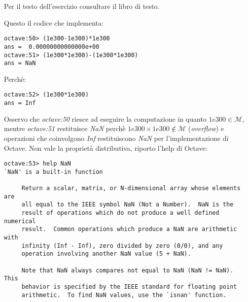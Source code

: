 \begin{exercise}[1.14]
Per il testo dell'esercizio consultare il libro di testo.
\end{exercise}
Questo il codice che implementa:
\begin{lstlisting}
octave:50> (1e300-1e300)*1e300
ans =  0.00000000000000e+00
octave:51> (1e300*1e300)-(1e300*1e300)
ans = NaN
\end{lstlisting}
Perch\`e:
\begin{lstlisting}
octave:52> (1e300*1e300)
ans = Inf
\end{lstlisting}
Osservo che \emph{octave:50} riesce ad eseguire la computazione in quanto $1e300 \in \mathcal{M}$,
mentre \emph{octave:51} restituisce \emph{NaN} perch\`e $1e300\times1e300 \not \in \mathcal{M}$
(\emph{overflow}) e operazioni che coinvolgono \emph{Inf} restituiscono \emph{NaN} 
per l'implementazione di Octave. Non vale la propriet\`a distributiva, riporto l'help di Octave:
\begin{lstlisting}
octave:53> help NaN
`NaN' is a built-in function

     Return a scalar, matrix, or N-dimensional array whose elements are
     all equal to the IEEE symbol NaN (Not a Number).  NaN is the
     result of operations which do not produce a well defined numerical
     result.  Common operations which produce a NaN are arithmetic with
     infinity (Inf - Inf), zero divided by zero (0/0), and any
     operation involving another NaN value (5 + NaN).

     Note that NaN always compares not equal to NaN (NaN != NaN).  This
     behavior is specified by the IEEE standard for floating point
     arithmetic.  To find NaN values, use the `isnan' function.

\end{lstlisting}

